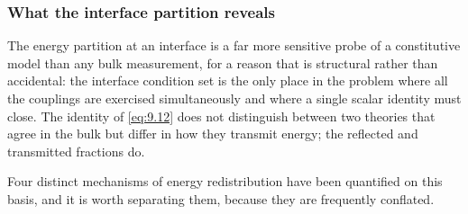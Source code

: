 \subsubsection{What the interface partition reveals}

The energy partition at an interface is a far more sensitive probe of a constitutive model than any bulk measurement, for a reason that is structural rather than accidental: the interface condition set is the only place in the problem where all the couplings are exercised simultaneously and where a single scalar identity must close. The identity of \eqref{eq:9.12} does not distinguish between two theories that agree in the bulk but differ in how they transmit energy; the reflected and transmitted fractions do.

Four distinct mechanisms of energy redistribution have been quantified on this basis, and it is worth separating them, because they are frequently conflated.


